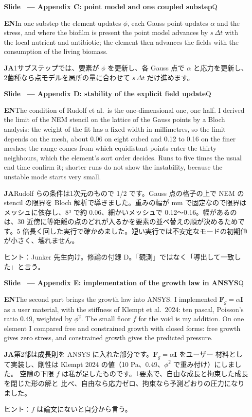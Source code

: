 \documentclass[11pt,a4paper]{article}
\newcounter{sl}
\newcommand{\slide}[2]{\stepcounter{sl}\vspace{8pt}%
  {\color{c3}\large\bfseries Slide \thesl\ --- #1}\hfill{\small #2}\par\vspace{2pt}}
\newcommand{\EN}{\textbf{EN}\quad}
\newcommand{\JA}{\par\textbf{JA}\quad}
\newcommand{\hint}[1]{\par{\color{gray}\small ヒント：#1}}
\begin{document}
\slide{Appendix C: point model and one coupled substep}{Q}
\EN In one substep the element updates $\phi$, each Gauss point updates $\alpha$ and the stress, and where the biofilm is present the point model advances by $s\,\Delta t$ with the local nutrient and antibiotic; the element then advances the fields with the consumption of the living biomass.
\JA 1サブステップでは、要素が $\phi$ を更新し、各 Gauss 点で $\alpha$ と応力を更新し、2菌種なら点モデルを局所の量に合わせて $s\,\Delta t$ だけ進めます。

\slide{Appendix D: stability of the explicit field update}{Q}
\EN The condition of Rudolf et al.\ is the one-dimensional one, one half. I derived the limit of the NEM stencil on the lattice of the Gauss points by a Bloch analysis: the weight of the fit has a fixed width in millimetres, so the limit depends on the mesh, about 0.06 on eight cubed and 0.12 to 0.16 on the finer meshes; the range comes from which equidistant points enter the thirty neighbours, which the element's sort order decides. Runs to five times the usual end time confirm it; shorter runs do not show the instability, because the unstable mode starts very small.
\JA Rudolf らの条件は1次元のもので 1/2 です。Gauss 点の格子の上で NEM の stencil の限界を Bloch 解析で導きました。重みの幅が mm で固定なので限界はメッシュに依存し、8³ で約 0.06、細かいメッシュで 0.12〜0.16。幅があるのは、30 近傍に等距離の点のどれが入るかを要素の並べ替えの順が決めるためです。5 倍長く回した実行で確かめました。短い実行では不安定なモードの初期値が小さく、壊れません。
\hint{Junker 先生向け。修論の付録 D。「観測」ではなく「導出して一致した」と言う。}

\slide{Appendix E: implementation of the growth law in ANSYS}{Q}
\EN The second part brings the growth law into ANSYS. I implemented
$\mathbf F_g=\alpha\mathbf I$ as a user material, with the stiffness of
Klempt et al.\ 2024: ten pascal, Poisson's ratio 0.49, weighted by $\phi^2$.
The small floor $f$ for the void is my addition. On one element I compared
free and constrained growth with closed forms: free growth gives zero
stress, and constrained growth gives the predicted pressure.
\JA 第2部は成長則を ANSYS に入れた部分です。$\mathbf F_g=\alpha\mathbf I$ をユーザー
材料として実装し、剛性は Klempt 2024 の値（10 Pa、0.49、$\phi^2$ で重み付け）にしました。
空隙の下限 $f$ は私が足したものです。1要素で、自由な成長と拘束した成長を閉じた形の解と
比べ、自由なら応力ゼロ、拘束なら予測どおりの圧力になりました。
\hint{$f$ は論文にないと自分から言う。}
\end{document}
